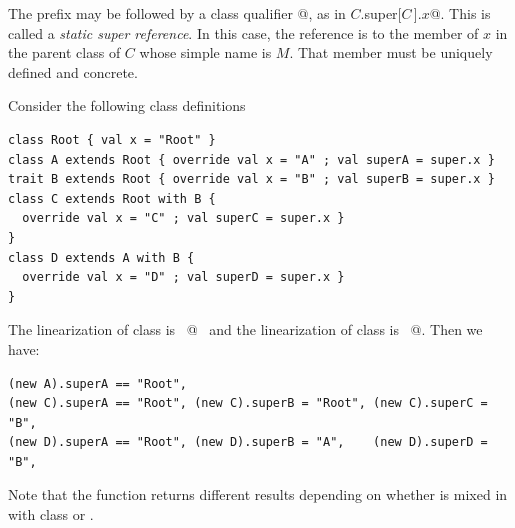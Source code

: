The  prefix may be followed by a class qualifier
\lstinline@[$C\,$]@, as in \lstinline@$C$.super[$C\,$].$x$@. This is
called a {\em static super reference}.  In this case, the reference is
to the member of $x$ in the parent class of $C$ whose simple
name is $M$. That member must be uniquely defined and concrete.

\example\label{ex:super}
Consider the following class definitions

\begin{lstlisting}
class Root { val x = "Root" }
class A extends Root { override val x = "A" ; val superA = super.x }
trait B extends Root { override val x = "B" ; val superB = super.x }
class C extends Root with B { 
  override val x = "C" ; val superC = super.x }
}
class D extends A with B {
  override val x = "D" ; val superD = super.x }
}
\end{lstlisting}
The linearization of class  is ~@~ and
the linearization of class  is ~@.
Then we have:
\begin{lstlisting}
(new A).superA == "Root", 
(new C).superA == "Root", (new C).superB = "Root", (new C).superC = "B",
(new D).superA == "Root", (new D).superB = "A",    (new D).superD = "B",
\end{lstlisting}
Note that the  function returns different results
depending on whether  is mixed in with class  or .


